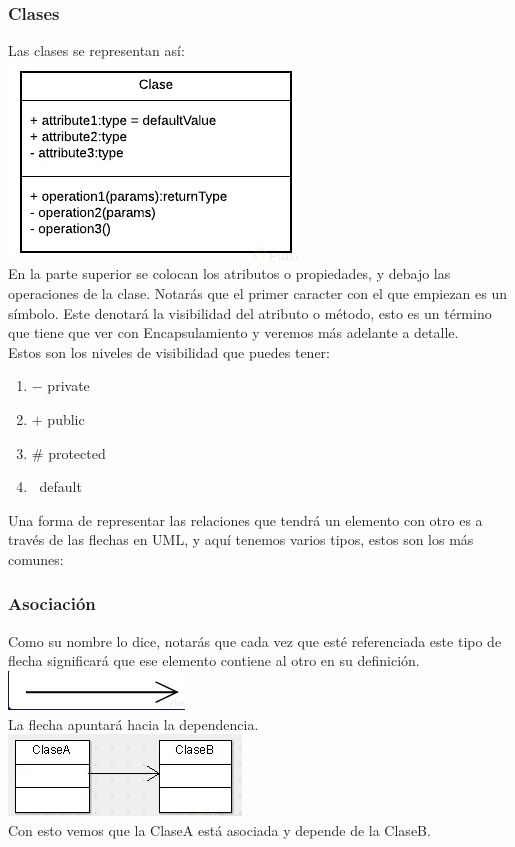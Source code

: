 \documentclass[executivepaper]{article}
\begin{document}
\subsubsection*{Clases}
Las clases se representan así:\\
\includegraphics[scale=0.5]{2.1.png}\\
En la parte superior se colocan los atributos o propiedades, y debajo las operaciones de la clase. Notarás que el primer caracter con el que empiezan es un símbolo. Este denotará la visibilidad del atributo o método, esto es un término que tiene que ver con Encapsulamiento y veremos más adelante a detalle.\\
Estos son los niveles de visibilidad que puedes tener:
\begin{enumerate}
    \item $-$  private
    \item $+$  public
    \item $\#$  protected
    \item $~$  default
\end{enumerate}

Una forma de representar las relaciones que tendrá un elemento con otro es a través de las flechas en UML, y aquí tenemos varios tipos, estos son los más comunes:
\subsubsection*{Asociación}
Como su nombre lo dice, notarás que cada vez que esté referenciada este tipo de flecha significará que ese elemento contiene al otro en su definición.\\
\includegraphics[scale=0.5]{2.2.png}\\
La flecha apuntará hacia la dependencia.\\
\includegraphics[scale=0.5]{2.3.png}\\
Con esto vemos que la ClaseA está asociada y depende de la ClaseB.
\end{document}
